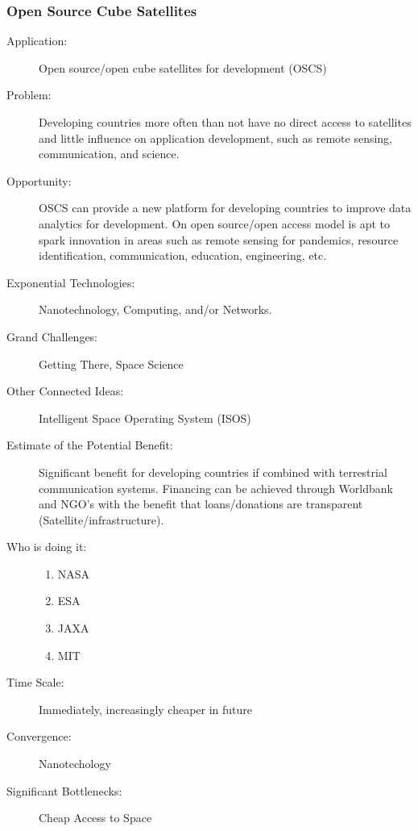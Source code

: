 \documentclass[letter,11pt]{article}
\begin{document}
\subsubsection{Open Source Cube Satellites}

\begin{description}
\item[Application:] Open source/open cube satellites for development (OSCS)
    
\item[Problem:] Developing countries more often than not have no direct access to satellites and little 
influence on application development, such as remote sensing, communication, and science. 
   
\item[Opportunity:] OSCS can provide a new platform for developing countries to improve data 
analytics for development. On open source/open access model is apt to spark innovation in areas 
such as remote sensing for pandemics, resource identification, communication, education, 
engineering, etc. 
 
\item[Exponential Technologies:]    Nanotechnology, Computing, and/or
Networks.
 
\item[Grand Challenges:] Getting There, Space Science
 
\item[Other Connected Ideas:]   Intelligent Space Operating System (ISOS)
 
\item[Estimate of the Potential Benefit:]  Significant benefit for developing countries if combined 
with terrestrial communication systems. Financing can be achieved through Worldbank and 
NGO’s with the benefit that loans/donations are transparent (Satellite/infrastructure).
 
\item[Who is doing it:]
\hfill\begin{enumerate}
\item NASA
\item ESA
\item JAXA
\item MIT
\end{enumerate}
 
\item[Time Scale:] Immediately, increasingly cheaper in future
 
\item[Convergence:] Nanotechology 
 
\item[Significant Bottlenecks:] Cheap Access to Space
\end{description}
\end{document}
